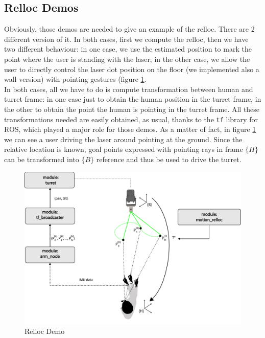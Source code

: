 \subsection{Relloc Demos}
Obviously, those demos are needed to give an example of the relloc. There are 2 different version of it. In both cases, first we compute the relloc, then we have two different behaviour: in one case, we use the estimated position to mark the point where the user is standing with the laser; in the other case, we allow the user to directly control the laser dot position on the floor (we implemented also a wall version) with pointing gestures (figure \ref{fig:rellocDemo}.\\
In both cases, all we have to do is compute transformation between human and turret frame: in one case just to obtain the human position in the turret frame, in the other to obtain the point the human is pointing in the turret frame. All these transformations needed are easily obtained, as usual, thanks to the \texttt{tf} library for ROS, which played a major role for those demos. As a matter of fact, in figure \ref{fig:rellocDemo} we can see a user driving the laser around pointing at the ground. Since the relative location is known, goal points expressed with pointing rays in frame $\{H\}$ can be transformed into $\{B\}$ reference and thus be used to drive the turret.
\begin{figure}
	\centering
	\includegraphics[width=\textwidth]{img/rellocDemo2.png}%
	\caption{Relloc Demo}
	\label{fig:rellocDemo}
\end{figure}
